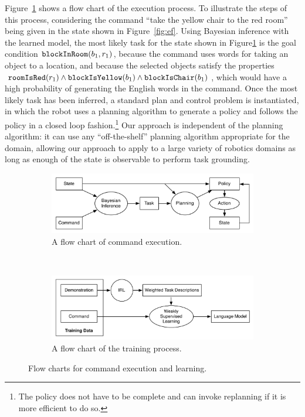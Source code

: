 \documentclass[conference]{IEEEtran}
\begin{document}
Figure~\ref{fig:execute} shows a flow chart of the execution process. To illustrate the steps of this process, considering the command ``take the yellow chair to the red room'' being given in the state shown in Figure~\ref{fig:ef}. Using Bayesian inference with the learned model, the most likely task for the state shown in Figure\ref{fig:execute} is the goal condition ${\tt blockInRoom}(b_1, r_1)$, because the command uses words for taking an object to a location, and because the selected objects satisfy the properties ${\tt roomIsRed}(r_1) \land {\tt blockIsYellow}(b_1) \land {\tt blockIsChair}(b_1)$, which would have a high probability of generating the English words in the command. Once the most likely task has been inferred, a standard plan and control problem is instantiated, in which the robot uses a planning algorithm to generate a policy and follows the policy in a closed loop fashion.\footnote{The policy does not have to be complete and can invoke replanning if it is more efficient to do so.} Our approach is independent of the planning algorithm: it can use any ``off-the-shelf'' planning algorithm appropriate for the domain, allowing our approach to apply to a large variety of robotics domains as long as enough of the state is observable to perform task grounding.

\begin{figure}
        \centering
        \begin{subfigure}[b]{\columnwidth}
                \includegraphics[width=\textwidth]{images/executeFlow}
                \caption{\small A flow chart of command execution.}
                \label{fig:execute}
        \end{subfigure}%
        \\
        \begin{subfigure}[b]{\columnwidth}
                \includegraphics[width=\textwidth]{images/trainFlow}
                \caption{\small A flow chart of the training process.}
                \label{fig:learn}
        \end{subfigure}
        \caption{\small Flow charts for command execution and learning.}\label{fig:flow}
\end{figure}
\end{document}
